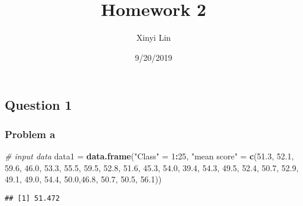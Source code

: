 \documentclass[]{article}
\title{Homework 2}
\author{Xinyi Lin}
\date{9/20/2019}
\newenvironment{Shaded}{\begin{snugshade}}{\end{snugshade}}
\newcommand{\CommentTok}[1]{\textcolor[rgb]{0.56,0.35,0.01}{\textit{#1}}}
\newcommand{\DecValTok}[1]{\textcolor[rgb]{0.00,0.00,0.81}{#1}}
\newcommand{\FloatTok}[1]{\textcolor[rgb]{0.00,0.00,0.81}{#1}}
\newcommand{\KeywordTok}[1]{\textcolor[rgb]{0.13,0.29,0.53}{\textbf{#1}}}
\newcommand{\NormalTok}[1]{#1}
\newcommand{\OperatorTok}[1]{\textcolor[rgb]{0.81,0.36,0.00}{\textbf{#1}}}
\newcommand{\StringTok}[1]{\textcolor[rgb]{0.31,0.60,0.02}{#1}}
\begin{document}
\maketitle

\hypertarget{question-1}{%
\subsection{Question 1}\label{question-1}}

\hypertarget{problem-a}{%
\subsubsection{Problem a}\label{problem-a}}

\begin{Shaded}
\begin{Highlighting}[]
\CommentTok{# input data}
\NormalTok{data1 =}\StringTok{ }\KeywordTok{data.frame}\NormalTok{(}\StringTok{"Class"}\NormalTok{ =}\StringTok{ }\DecValTok{1}\OperatorTok{:}\DecValTok{25}\NormalTok{, }\StringTok{"mean score"}\NormalTok{ =}\StringTok{ }\KeywordTok{c}\NormalTok{(}\FloatTok{51.3}\NormalTok{, }\FloatTok{52.1}\NormalTok{, }\FloatTok{59.6}\NormalTok{, }\FloatTok{46.0}\NormalTok{, }\FloatTok{53.3}\NormalTok{, }\FloatTok{55.5}\NormalTok{, }\FloatTok{59.5}\NormalTok{, }\FloatTok{52.8}\NormalTok{, }\FloatTok{51.6}\NormalTok{, }\FloatTok{45.3}\NormalTok{, }\FloatTok{54.0}\NormalTok{, }\FloatTok{39.4}\NormalTok{, }\FloatTok{54.3}\NormalTok{, }\FloatTok{49.5}\NormalTok{, }\FloatTok{52.4}\NormalTok{, }\FloatTok{50.7}\NormalTok{, }\FloatTok{52.9}\NormalTok{, }\FloatTok{49.1}\NormalTok{, }\FloatTok{49.0}\NormalTok{, }\FloatTok{54.4}\NormalTok{, }\FloatTok{50.0}\NormalTok{,}\FloatTok{46.8}\NormalTok{, }\FloatTok{50.7}\NormalTok{, }\FloatTok{50.5}\NormalTok{, }\FloatTok{56.1}\NormalTok{))}
\end{Highlighting}
\end{Shaded}

\begin{Shaded}
\end{Shaded}

\begin{verbatim}
## [1] 51.472
\end{verbatim}

\begin{Shaded}
\end{Shaded}
\end{document}

